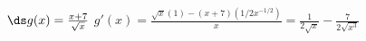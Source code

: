 {$\ds g(x) = \frac{x+7}{\sqrt{x}}$
}
{$g'(x) = \frac{\sqrt{x}(1)-(x+7)(1/2x^{-1/2})}{x} = \frac{1}{2\sqrt{x}}-\frac{7}{2\sqrt{x^3}}$
}

